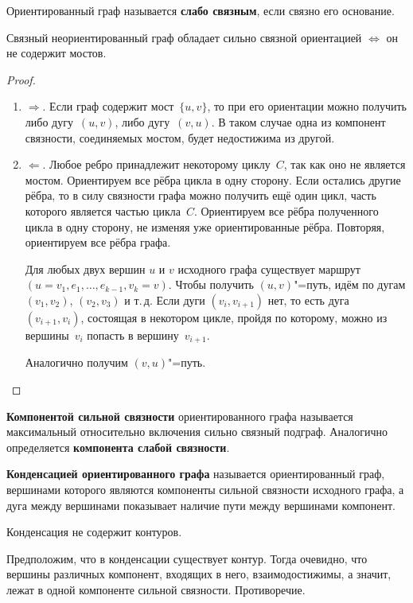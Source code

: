 Ориентированный граф называется \textbf{слабо связным}, если связно его основание.

\begin{theorem}
Связный неориентированный граф обладает сильно связной ориентацией $\Leftrightarrow$ он не содержит мостов.
\end{theorem}
\begin{proof}
\begin{enumerate}
	\item $\Rightarrow$. Если граф содержит мост~$\{ u, v \}$, то при его ориентации можно получить либо дугу~$(u, v)$, либо дугу~$(v, u)$.
	В таком случае одна из компонент связности, соединяемых мостом, будет недостижима из другой.
	
	\item $\Leftarrow$. Любое ребро принадлежит некоторому циклу~$C$, так как оно не является мостом.
	Ориентируем все рёбра цикла в одну сторону.
	Если остались другие рёбра, то в силу связности графа можно получить ещё один цикл, часть которого является частью цикла~$C$.
	Ориентируем все рёбра полученного цикла в одну сторону, не изменяя уже ориентированные рёбра.
	Повторяя, ориентируем все рёбра графа.
	
	Для любых двух вершин $u$ и $v$ исходного графа существует маршрут $(u = v_1, e_1, \ldots, e_{k-1}, v_k = v)$.
	Чтобы получить $(u, v)$"=путь, идём по дугам $(v_1, v_2)$, $(v_2, v_3)$ и т.\,д.
	Если дуги $(v_i, v_{i+1})$ нет, то есть дуга $(v_{i+1}, v_i)$, состоящая в некотором цикле, пройдя по которому, можно из вершины~$v_i$ попасть в вершину~$v_{i+1}$.
	
	Аналогично получим $(v, u)$"=путь.
\end{enumerate}
\end{proof}

 \textbf{Компонентой сильной связности} ориентированного графа называется максимальный относительно включения сильно связный подграф.
Аналогично определяется \textbf{компонента слабой связности}.

\textbf{Конденсацией ориентированного графа} называется ориентированный граф, вершинами которого являются компоненты сильной связности исходного графа, а дуга между вершинами показывает наличие пути между вершинами компонент.

\begin{statement}
Конденсация не содержит контуров.
\end{statement}
\begin{proofcontra}
Предположим, что в конденсации существует контур.
Тогда очевидно, что вершины различных компонент, входящих в него, взаимодостижимы, а значит, лежат в одной компоненте сильной связности.
Противоречие.
\end{proofcontra}

